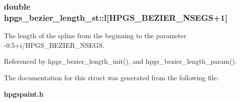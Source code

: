 \subsubsection[{l}]{\setlength{\rightskip}{0pt plus 5cm}double {\bf hpgs\_\-bezier\_\-length\_\-st::l}[HPGS\_\-BEZIER\_\-NSEGS+1]}\label{structhpgs__bezier__length__st_a59bf18b9efbb949ab3c75a56e0c39e4f}
The length of the spline from the beginning to the parameter -\/0.5+i/HPGS\_\-BEZIER\_\-NSEGS. 

Referenced by hpgs\_\-bezier\_\-length\_\-init(), and hpgs\_\-bezier\_\-length\_\-param().



The documentation for this struct was generated from the following file:\begin{DoxyCompactItemize}
\item 
{\bf hpgspaint.h}\end{DoxyCompactItemize}

